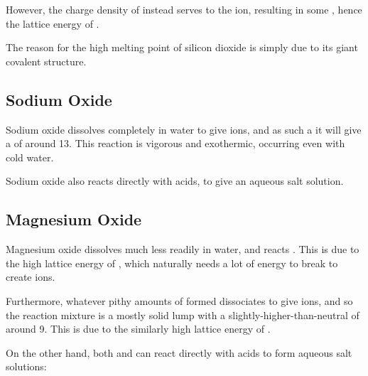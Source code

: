 			However, the  charge density of  instead serves to  the  ion, resulting
			in some , hence  the lattice energy of .

			The reason for the high melting point of silicon dioxide is simply due to its giant covalent structure.



		\pagebreak
		\subsection{Sodium Oxide}

			Sodium oxide dissolves completely in water to give  ions, and as such a it will give a \pH{} of around \num{13}. This
			reaction is vigorous and exothermic, occurring even with cold water.

			Sodium oxide also reacts directly with acids, to give an aqueous salt solution.




		\subsection{Magnesium Oxide}

			Magnesium oxide dissolves much less readily in water, and reacts . This is due to the high lattice energy of
			, which naturally needs a lot of energy to break to create ions.

			Furthermore, whatever pithy amounts of  formed  dissociates to give  ions, and so the reaction
			mixture is a mostly solid lump with a slightly-higher-than-neutral \pH{} of around \num{9}. This is due to the similarly high lattice
			energy of .


			On the other hand, both  and  can react directly with acids to form aqueous salt solutions:

